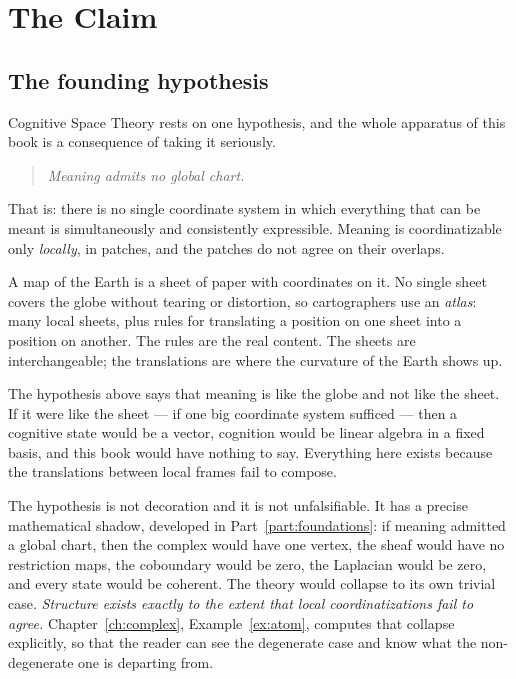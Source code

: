 %

\chapter{The Claim}\label{ch:claim}

\section{The founding hypothesis}\label{sec:hypothesis}

Cognitive Space Theory rests on one hypothesis, and the whole apparatus of
this book is a consequence of taking it seriously.

\begin{quote}\itshape
Meaning admits no global chart.
\end{quote}

That is: there is no single coordinate system in which everything that can be
meant is simultaneously and consistently expressible. Meaning is
coordinatizable only \emph{locally}, in patches, and the patches do not agree
on their overlaps.

\begin{intu}\Intu
A map of the Earth is a sheet of paper with coordinates on it. No single
sheet covers the globe without tearing or distortion, so cartographers use an
\emph{atlas}: many local sheets, plus rules for translating a position on one
sheet into a position on another. The rules are the real content. The sheets
are interchangeable; the translations are where the curvature of the Earth
shows up.

The hypothesis above says that meaning is like the globe and not like the
sheet. If it were like the sheet --- if one big coordinate system sufficed ---
then a cognitive state would be a vector, cognition would be linear algebra in
a fixed basis, and this book would have nothing to say. Everything here exists
because the translations between local frames fail to compose.
\end{intu}

The hypothesis is not decoration and it is not unfalsifiable. It has a precise
mathematical shadow, developed in Part~\ref{part:foundations}: if meaning
admitted a global chart, then the complex would have one vertex, the sheaf
would have no restriction maps, the coboundary would be zero, the Laplacian
would be zero, and every state would be coherent. The theory would collapse to
its own trivial case. \emph{Structure exists exactly to the extent that
local coordinatizations fail to agree.} Chapter~\ref{ch:complex},
Example~\ref{ex:atom}, computes that collapse explicitly, so that the reader
can see the degenerate case and know what the non-degenerate one is departing
from.

